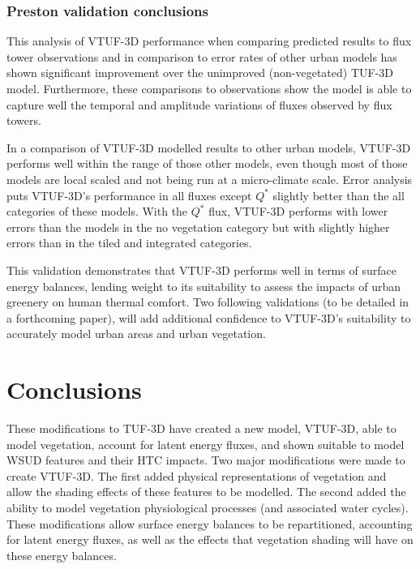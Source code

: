 \documentclass[preprint,12pt,authoryear]{elsarticle}
\begin{document}
\subsubsection{Preston validation conclusions}

This analysis of VTUF-3D performance when comparing predicted results to flux tower observations and in comparison to error rates of other urban models has shown significant improvement over the unimproved (non-vegetated) TUF-3D model. Furthermore, these comparisons to observations show the model is able to capture well the temporal and amplitude variations of fluxes observed by flux towers. 

In a comparison of VTUF-3D modelled results to other urban models, VTUF-3D performs well within the range of those other models, even though most of those models are local scaled and not being run at a micro-climate scale. Error analysis puts VTUF-3D's performance in all fluxes except $Q^{*}$ slightly better than the all categories of these models. With the $Q^{*}$ flux, VTUF-3D performs with lower errors than the models in the no vegetation category but with slightly higher errors than in the tiled and integrated categories. 

This validation demonstrates that VTUF-3D performs well in terms of surface energy balances, lending weight to its suitability to assess the impacts of urban greenery on human thermal comfort. Two following validations (to be detailed in a forthcoming paper), will add additional confidence to VTUF-3D's suitability to accurately model urban areas and urban vegetation.














\section{Conclusions} \label{sec:DesignConc} 

These modifications to TUF-3D have created a new model, VTUF-3D, able to model vegetation, account for latent energy fluxes, and shown suitable to model WSUD features and their HTC impacts. Two major modifications were made to create VTUF-3D. The first added physical representations of vegetation and allow the shading effects of these features to be modelled. The second added the ability to model vegetation physiological processes (and associated water cycles). These modifications allow surface energy balances to be repartitioned, accounting for latent energy fluxes, as well as the effects that vegetation shading will have on these energy balances. 
\end{document}

